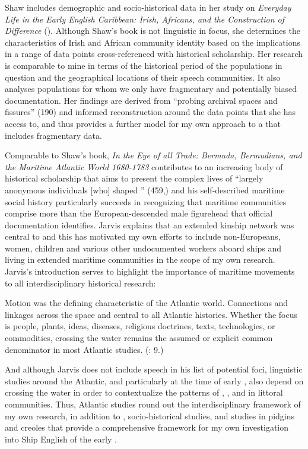 Shaw includes demographic and socio-historical data in her study on \textit{Everyday Life in the Early English Caribbean: Irish, Africans, and the Construction of Difference} (\citeyear*{Shaw2013}). Although Shaw’s book is not linguistic in focus, she determines the characteristics of Irish and African community identity based on the implications in a range of data points cross-referenced with historical scholarship. Her research is comparable to mine in terms of the historical period of the populations in question and the geographical locations of their speech communities. It also analyses populations for whom we only have fragmentary and potentially biased documentation. Her findings are derived from “probing archival spaces and fissures” (190) and informed reconstruction around the data points that she has access to, and thus provides a further model for my own approach to a  that includes fragmentary data. 

Comparable to Shaw’s book,  \textit{In the Eye of all Trade: Bermuda, Bermudians, and the Maritime Atlantic World {1680}-1783} contributes to an increasing body of historical scholarship that aims to present the complex lives of “largely anonymous individuals [who] shaped ” (459,) and his self-described maritime social history particularly succeeds in recognizing that maritime communities comprise more than the European-descended male figurehead that official documentation identifies. Jarvis explains that an extended kinship network was central to  and this has motivated my own efforts to include non-Europeans, women, children and various other undocumented workers aboard ships and living in extended maritime communities in the scope of my own research. Jarvis’s introduction serves to highlight the importance of maritime movements to all interdisciplinary historical research: 

Motion was the defining characteristic of the Atlantic world. Connections and linkages across the space and central to all Atlantic histories. Whether the focus is people, plants, ideas, diseases, religious doctrines, texts, technologies, or commodities, crossing the water remains the assumed or explicit common denominator in most Atlantic studies. (\citealt{Jarvis2010}: 9.)

And although Jarvis does not include speech in his list of potential foci, linguistic studies around the Atlantic, and particularly at the time of early , also depend on crossing the water in order to contextualize the patterns of ,  , and  in littoral communities. Thus, Atlantic studies round out the interdisciplinary framework of my own research, in addition to , socio-historical studies, and studies in pidgins and creoles that provide a comprehensive framework for my own investigation into Ship English of the early . 

